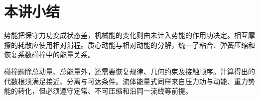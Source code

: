 \section{本讲小结}
势能把保守力功变成状态差，机械能的变化则由未计入势能的作用功决定。相互摩擦的耗散应使用相对滑程。质心动能与相对动能的分解，统一了粘合、弹簧压缩和恢复系数碰撞中的能量关系。

碰撞题除总动量、总能量外，还需要恢复规律、几何约束及接触顺序。计算得出的代数根须满足接近、分离与可达条件。流体能量式同样来自压力功与动能、重力势能的转化，但必须遵守定常、不可压缩和沿同一流线等前提。

